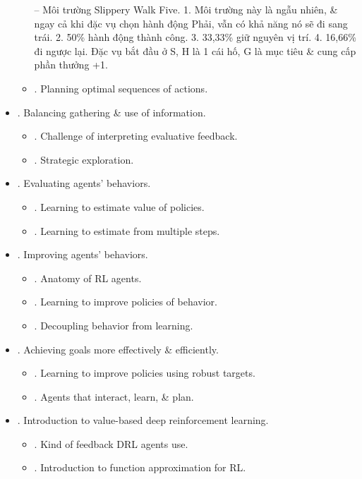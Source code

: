 \documentclass{article}
\begin{document}
\begin{itemize}
\begin{itemize}
        -- {\sf Môi trường Slippery Walk Five.} 1. Môi trường này là ngẫu nhiên, \& ngay cả khi đặc vụ chọn hành động Phải, vẫn có khả năng nó sẽ đi sang trái. 2. 50\% hành động thành công. 3. 33,33\% giữ nguyên vị trí. 4. 16,66\% đi ngược lại. Đặc vụ bắt đầu ở S, H là 1 cái hố, G là mục tiêu \& cung cấp phần thưởng +1.
        \item {. Planning optimal sequences of actions.}
    \end{itemize}
    \item {. Balancing gathering \& use of information.}
    \begin{itemize}
        \item {. Challenge of interpreting evaluative feedback.}
        \item {. Strategic exploration.}
    \end{itemize}
    \item {. Evaluating agents' behaviors.}
    \begin{itemize}
        \item {. Learning to estimate value of policies.}
        \item {. Learning to estimate from multiple steps.}
    \end{itemize}
    \item {. Improving agents' behaviors.}
    \begin{itemize}
        \item {. Anatomy of RL agents.}
        \item {. Learning to improve policies of behavior.}
        \item {. Decoupling behavior from learning.}
    \end{itemize}
    \item {. Achieving goals more effectively \& efficiently.}
    \begin{itemize}
        \item {. Learning to improve policies using robust targets.}
        \item {. Agents that interact, learn, \& plan.}
    \end{itemize}
    \item {. Introduction to value-based deep reinforcement learning.}
    \begin{itemize}
        \item {. Kind of feedback DRL agents use.}
        \item {. Introduction to function approximation for RL.}

\end{itemize}
\end{itemize}
\end{document}
